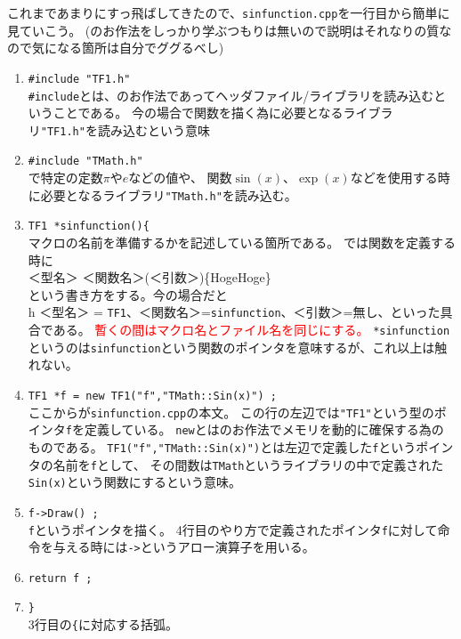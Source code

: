 \documentclass{jarticle}
\begin{document}
これまであまりにすっ飛ばしてきたので、\verb|sinfunction.cpp|を一行目から簡単に見ていこう。
(\Cpp のお作法をしっかり学ぶつもりは無いので説明はそれなりの質なので気になる箇所は自分でググるべし)
\begin{enumerate}
 \item \verb|#include "TF1.h"| \\
       \verb|#include|とは、\Cpp のお作法であってヘッダファイル/ライブラリを読み込むということである。
       今の場合\ROOT で関数を描く為に必要となるライブラリ\verb|"TF1.h"|を読み込むという意味
 \item \verb|#include "TMath.h"| \\ 
       \ROOT で特定の定数$\pi$や$e$などの値や、
       関数$\sin(x)$、$\exp(x)$などを使用する時に必要となるライブラリ\verb|"TMath.h"|を読み込む。
 \item \verb|TF1 *sinfunction(){ |\\
       マクロの名前を準備するかを記述している箇所である。
       \Cpp では関数を定義する時に \\
       ＜型名＞ ＜関数名＞(＜引数＞)\{HogeHoge\} \\
       という書き方をする。今の場合だと\\
       h       ＜型名＞ = \verb|TF1|、＜関数名＞=\verb|sinfunction|、＜引数＞=無し、といった具合である。
       \textcolor{red}{暫くの間はマクロ名とファイル名を同じにする。}
       \verb|*sinfunction|というのは\verb|sinfunction|という関数のポインタを意味するが、これ以上は触れない。
 \item \verb|TF1 *f = new TF1("f","TMath::Sin(x)") ;| \\
       ここからが\verb|sinfunction.cpp|の本文。
       この行の左辺では\verb|"TF1"|という型のポインタ\verb|f|を定義している。
       \verb|new|とは\Cpp のお作法でメモリを動的に確保する為のものである。
       \verb|TF1("f","TMath::Sin(x)")|とは左辺で定義した\verb|f|というポインタの名前を\verb|f|として、
       その間数は\verb|TMath|というライブラリの中で定義された\verb|Sin(x)|という関数にするという意味。
 \item \verb|f->Draw() ;| \\
       \verb|f|というポインタを描く。
       4行目のやり方で定義されたポインタ\verb|f|に対して命令を与える時には\verb|->|というアロー演算子を用いる。
 \item \verb|return f ;|
 \item \verb|}| \\
       3行目の\verb|{|に対応する括弧。
\end{enumerate}
\end{document}
